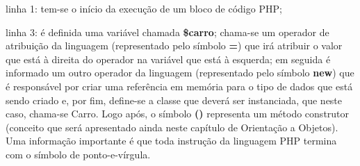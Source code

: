 \begin{alineas}
    \item linha 1: tem-se o início da execução de um bloco de código PHP;
    \item linha 3: é definida uma variável chamada \textbf{\$carro};
    chama-se um operador de atribuição da linguagem (representado pelo símbolo
    \textbf{=}) que irá atribuir o valor que está à direita do operador na
    variável que está à esquerda; em seguida é informado um outro operador da
    linguagem (representado pelo símbolo \textbf{new}) que é responsável por
    criar uma referência em memória para o tipo de dados que está sendo
    criado e, por fim, define-se a classe que deverá ser instanciada, que neste
    caso, chama-se Carro. Logo após, o símbolo \textbf{()} representa um método
    construtor (conceito que será apresentado ainda neste capítulo de Orientação
    a Objetos).
    Uma informação importante é que toda instrução da linguagem \acs{PHP} termina
    com o símbolo de ponto-e-vírgula.
\end{alineas}